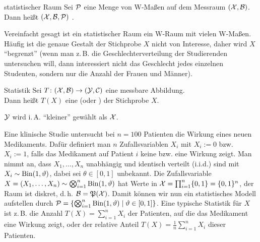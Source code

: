 \linie
\pagebreak

\begin{Def}{statistischer Raum}
    Sei $\P$ eine Menge von W-Maßen auf dem Messraum $(\X, \B)$.\\
    Dann heißt $(\X, \B, \P)$ .
\end{Def}

\begin{Bem}
    Vereinfacht gesagt ist ein statistischer Raum ein W-Raum mit vielen W-Maßen.\\
    Häufig ist die genaue Gestalt der Stichprobe $X$ nicht von Interesse,
    daher wird $X$ "`begrenzt"'
    (wenn man z.\,B. die Geschlechterverteilung der Studierenden untersuchen will,
    dann interessiert nicht das Geschlecht jedes einzelnen Studenten,
    sondern nur die Anzahl der Frauen und Männer).
\end{Bem}

\begin{Def}{Statistik}
    Sei $T\colon (\X, \B) \rightarrow (\Y, \C)$ eine messbare Abbildung.\\
    Dann heißt $T(X)$ eine  (oder )
    der Stichprobe $X$.
\end{Def}

\begin{Bem}
    $\Y$ wird i.\,A. "`kleiner"' gewählt als $\X$.
\end{Bem}

\begin{Bsp}
    Eine klinische Studie untersucht bei $n = 100$ Patienten die Wirkung eines neuen Medikaments.
    Dafür definiert man $n$ Zufallsvariablen $X_i$ mit $X_i := 0$ bzw. $X_i := 1$, falls
    das Medikament auf Patient $i$ keine bzw. eine Wirkung zeigt.
    Man nimmt an, dass $X_1, \dotsc, X_n$ unabhängig
    und identisch verteilt (i.i.d.) sind mit $X_i \sim \Bin(1, \theta)$,
    dabei sei $\theta \in [0, 1]$ unbekannt.
    Die Zufallsvariable $X = (X_1, \dotsc, X_n) \sim \bigotimes_{i=1}^n \Bin(1, \theta)$
    hat Werte in $\X = \prod_{i=1}^n \{0, 1\} = \{0, 1\}^n$,
    der Raum ist diskret, d.\,h. $\B = \pot(\X)$.
    Damit können wir nun ein statistisches Modell aufstellen durch
    $\P = \left\{\bigotimes_{i=1}^n \Bin(1, \theta) \;|\; \theta \in [0, 1]\right\}$.
    Eine typische Statistik für $X$ ist z.\,B. die Anzahl $T(X) = \sum_{i=1}^n X_i$ der Patienten,
    auf die das Medikament eine Wirkung zeigt, oder der relative Anteil
    $T(X) = \frac{1}{n} \sum_{i=1}^n X_i$ dieser Patienten.
\end{Bsp}

